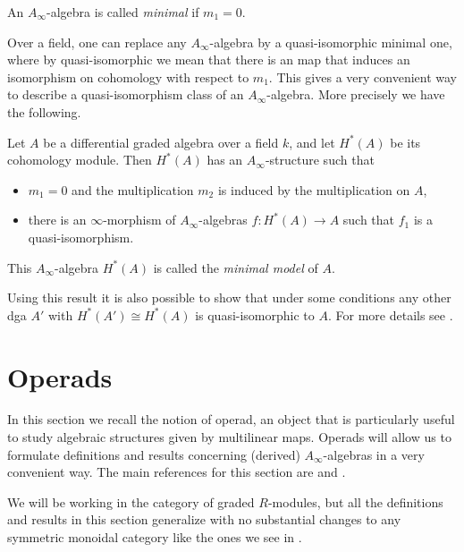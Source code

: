 \documentclass[Thesis.tex]{subfiles}
\begin{document}
\begin{defin}\label{minimal}
An $A_\infty$-algebra is called \emph{minimal} if $m_1 = 0$.
\end{defin}

Over a field, one can replace any $A_\infty$-algebra by a quasi-isomorphic minimal one, where by quasi-isomorphic we mean that there is an map that induces an isomorphism on cohomology with respect to $m_1$. This gives a very convenient way to describe a quasi-isomorphism class of an $A_\infty$-algebra. More precisely we have the following.

\begin{thm}[Kadeishvili]\label{minimaltheorem} Let $A$ be a differential graded algebra over a field $k$, and let $H^*(A)$ be its cohomology module. Then $H^*(A)$ has an $A_\infty$-structure such that
\begin{itemize}
\item $m_1 = 0$ and the multiplication $m_2$ is induced by the multiplication on $A$,
\item there is an $\infty$-morphism of $A_\infty$-algebras $f : H^*(A) \to A$ such that $f_1$ is a quasi-isomorphism.
\end{itemize}
This $A_\infty$-algebra $H^*(A)$ is called the \emph{minimal model} of $A$.
\end{thm}

Using this result it is also possible to show that under some conditions any other dga $A'$ with $H^*(A')\cong H^*(A)$ is quasi-isomorphic to $A$. For more details see \cite{kade}.
\section{Operads}\label{back3}

In this section we recall the notion of operad, an object that is particularly useful to study algebraic structures given by multilinear maps. Operads will allow us to formulate definitions and results concerning (derived) $A_\infty$-algebras in a very convenient way. The main references for this section are \cite{lodayvallette} and \cite{ward}.

We will be working in the category of graded $R$-modules, but all the definitions and results in this section generalize with no substantial changes to any symmetric monoidal category like the ones we see in . 
\end{document}
